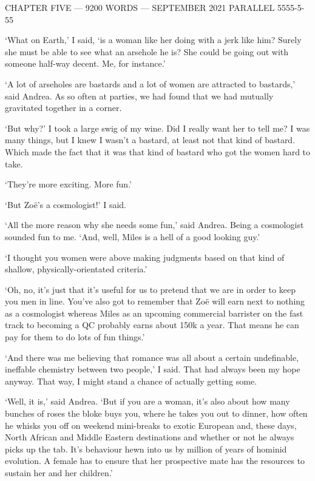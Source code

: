 {\parindent=0pt {\obeylines
{\twelvess CHAPTER FIVE --- 9200 WORDS --- SEPTEMBER 2021}
{\twelvess PARALLEL 5555-5-55}}
\vskip 1cm

\twelverm
`What on Earth,' I said, `is a woman like her doing with a
jerk like him? Surely she must be able to see what an arsehole he
is? She could be going out with someone half-way decent. Me, for
instance.'}

`A lot of arseholes are bastards and a lot of women are attracted to
bastards,' said Andrea. As so often at parties, we
had found that we had mutually gravitated together in a corner.

`But why?' I took a large swig of my wine. Did I really want her to
tell me? I was many things, but I knew I wasn't a bastard, at least not that kind of bastard. Which
made the fact that it was that kind of bastard who got the women hard to
take.

`They're more exciting. More fun.'

`But Zoë's a cosmologist!' I said.

`All the more reason why she needs some fun,' said Andrea. Being a cosmologist
sounded fun to me. `And, well, Miles is a hell of a good looking
guy.'

`I thought you women were above making judgments based on that kind of shallow, physically-orientated criteria.'

`Oh, no, it's just that it's useful for us to pretend
that we are in order to keep you men in line. You've also got to
remember that Zoë will earn next to nothing as a cosmologist whereas Miles as an
upcoming commercial barrister on the fast track to becoming a QC probably earns about 150k a year.
That means he can pay for them to do lots of fun things.'

`And there was me believing that romance was all about a certain undefinable, ineffable
chemistry between two people,' I said. That had always been my hope anyway.
That way, I might stand a chance of actually getting some.

`Well, it is,' said Andrea. `But if you are a woman, it's also about how many
bunches of roses the bloke buys you, where he takes you out to dinner,
how often he whisks you off on weekend mini-breaks to exotic
European and, these days, North African and Middle Eastern destinations and whether or not he {\twelveit always\/}
picks up the tab.
It's behaviour hewn into us by million of years of hominid
evolution. A female has to ensure that her prospective mate has the resources
to sustain her and her children.'

